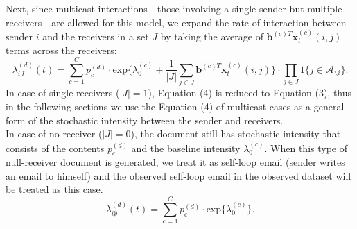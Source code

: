 \documentclass[a4paper]{article}
\begin{document}
Next, since multicast interactions—those involving a single sender but multiple
receivers—are allowed for this model, we expand the rate of interaction between sender $i$ and the receivers in a set $J$ by taking the average of $\boldsymbol{b}^{(c)T}\boldsymbol{x}^{(c)}_t(i, j)$ terms across the receivers:
\begin{equation}
\lambda^{(d)}_{iJ}(t)= \sum\limits_{c=1}^{C} p^{(d)}_c\cdot\mbox{exp}\Big\{\lambda^{(c)}_0+\frac{1}{|J|}\sum\limits_{j \in J} \boldsymbol{b}^{(c)T}\boldsymbol{x}^{(c)}_t(i, j)\Big\}\cdot \prod\limits_{j \in J}1\{j \in \mathcal{A}_{\backslash i}\}.
\end{equation}
In case of single receivers ($|J|=1$),  Equation (4) is reduced to Equation (3), thus in the following sections we use the Equation (4) of multicast cases as a general form of the stochastic intensity between the sender and receivers.\\ \newline
In case of no receiver ($|J|=0$), the document still has stochastic intensity that consists of the contents $p^{(d)}_c$ and the baseline intensity $\lambda^{(c)}_0.$ When this type of null-receiver document is generated, we treat it as self-loop email (sender writes an email to himself) and the observed self-loop email in the observed dataset will be treated as this case.
\begin{equation}
\lambda^{(d)}_{i\emptyset}(t)= \sum\limits_{c=1}^{C} p^{(d)}_c\cdot\mbox{exp}\Big\{\lambda^{(c)}_0\Big\}.
\end{equation}
\end{document}

